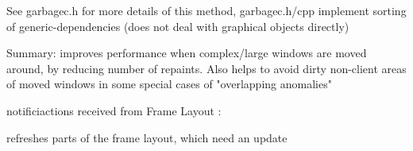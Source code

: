     See garbagec.h for more details of this method, garbagec.h/cpp
    implement sorting of generic-dependencies (does not deal
    with graphical objects directly)
  
    Summary: improves performance when complex/large windows are 
             moved around, by reducing number of repaints. Also helps 
             to avoid dirty non-client areas of moved windows
             in some special cases of "overlapping anomalies"
 





\label{cbgcupdatesmgrcbgcupdatesmgr}





\label{cbgcupdatesmgradditem}



\label{cbgcupdatesmgrdorepositionitems}



\label{cbgcupdatesmgronstartchanges}


notificiactions received from Frame Layout :


\label{cbgcupdatesmgrupdatenow}


refreshes parts of the frame layout, which need an update

